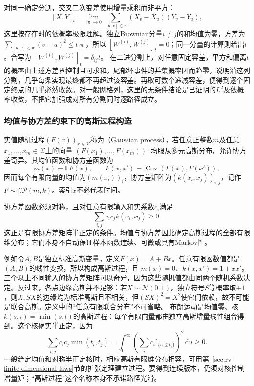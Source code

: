 对同一确定分割，交叉二次变差使用增量乘积而非平方：
\[
[X,Y]_t=\lim_{|\pi|\to0}\sum_{[u,v]\in\pi}
(X_v-X_u)(Y_v-Y_u),
\]
这里按存在时的依概率极限理解。独立Brownian分量\(i\ne j\)的和均值为零，方差为
\(\sum_{[u,v]\in\pi}(v-u)^2\leq t|\pi|\)，所以
\([W^{(i)},W^{(j)}]_t=0\)；同一分量的计算则给出\(t\)。合写为
\([W^{(i)},W^{(j)}]_t=\delta_{ij}t\)。
在二进分割上，对任意固定容差，平方和偏离\(t\)的概率由上述方差界控制且可求和。尾部坏事件的并集概率因而趋零，说明沿这列分割，几乎每条实现最终都不再超过该容差。再取可数个递减容差，便得到逐个固定终点的几乎必然收敛。对一般网格列，这里的无条件结论是已证明的\(L^2\)及依概率收敛，不把它加强成对所有分割同时逐路径成立。

\subsubsection{均值与协方差约束下的高斯过程构造}
\begin{definition}[高斯过程]
  \label{def:stoch-gaussian-process}
  实值随机过程\((F(x))_{x\in\mathcal X}\)称为（Gaussian process），若任意正整数\(m\)及任意\(x_1,\ldots,x_m\in\mathcal X\)上的向量
  \((F(x_1),\ldots,F(x_m))^\top\)均服从多元高斯分布，允许协方差奇异。其均值函数和协方差函数为
  \[
    m(x)=\mathbb E F(x),\qquad
    k(x,x')=\operatorname{Cov}(F(x),F(x')),
  \]
  因而每个有限向量的均值为\((m(x_i))_i\)，协方差矩阵为\((k(x_i,x_j))_{i,j}\)，记作\(F\sim\mathcal{GP}(m,k)\)。索引\(x\)不必代表时间。
\end{definition}
协方差函数必须对称，且对任意有限输入和实系数\(c_i\)满足
\[
  \sum_{i,j}c_ic_jk(x_i,x_j)\geq0.
\]
这正是有限协方差矩阵半正定的条件。均值与协方差因此确定高斯过程的全部有限维分布；它们本身不自动保证样本函数连续、可微或具有Markov性。

例如令\(A,B\)是独立标准高斯变量，定义\(F(x)=A+Bx\)。任意有限函数值都是\((A,B)\)的线性变换，所以构成高斯过程，且
\(m(x)=0\)、\(k(x,x')=1+xx'\)。三个以上不同输入的协方差矩阵可以奇异，因为这些随机值都由同两个随机系数决定。反过来，各点边缘高斯并不足够：若\(X\sim\mathcal N(0,1)\)，独立符号\(S\)等概率取\(\pm1\)，则\(X,SX\)的边缘均为标准高斯且不相关，但\((SX)^2=X^2\)使它们依赖，故不可能是联合高斯。定义中的“任意有限联合分布”不可省略。
布朗运动是均值零、核\(k(s,t)=\min(s,t)\)的高斯过程：每个有限向量都由独立高斯增量线性组合得到。这个核确实半正定，因为
\[
\sum_{i,j}c_ic_j\min(t_i,t_j)
=\int_0^\infty\left(\sum_i c_i\mathbb I_{\{u\leq t_i\}}\right)^2\,\mathrm du\geq0.
\]
一般给定均值和对称半正定核时，相应高斯有限维分布相容，可用第~\ref{sec:rv-finite-dimensional-laws}节的扩张定理建立过程。要得到连续版本，仍须对核控制增量矩；“高斯过程”这个名称本身不承诺路径光滑。

